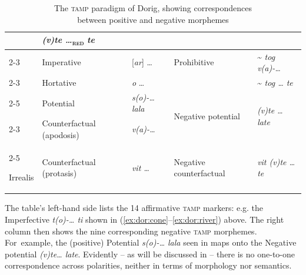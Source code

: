 \documentclass[output=paper,colorlinks,citecolor=brown,draft]{langscibook}
\begin{document}
\begin{table}
\begin{tabularx}{\textwidth}{|l|lX|ll|}
                                                                                        &  \textit{(v)te …}\textsc{\textsubscript{red}} \textit{te} \\
\cline{2-3}
             & Imperative                   & [\textit{ar}] …       & {Prohibitive}    & {\textasciitilde} \textit{tog v(a)-…}\\
\cline{2-3}
             & Hortative                    & \textit{o} …          &  & {\textasciitilde} \textit{tog … te}\\
\cline{2-5}
             & Potential                    & \textit{s(o)-… lala}  & \multirow{2}{*}{Negative potential} & \multirow{2}{*}{\textit{(v)te … late}}\\
\cline{2-3}
             & Counterfactual (apodosis) & \textit{v(a)-…} &  & \\
\cline{2-5}

{Irrealis}             & Counterfactual (protasis) & \textit{vit …} & Negative counterfactual & \textit{vit (v)te … te}\\
\hline
\end{tabularx}
    \caption{The \textsc{tamp} paradigm of Dorig, showing correspondences \\between positive and negative morphemes}
    \label{tab:dor:tamp}
\end{table}


The table’s left-hand side lists the 14 affirmative \textsc{tamp} markers: e.g. the Imper\-fec\-tive \textit{t(o)-… ti} shown in (\ref{ex:dor:cone}--\ref{ex:dor:river}) above. The right column then shows the nine corresponding negative \textsc{tamp} morphemes. For~example, the (positive) Potential \textit{s(o)-… lala} seen in  maps onto the Negative potential \textit{(v)te… late}. Evidently -- as will be discussed in  -- there is no one-to-one correspondence across polarities, neither in terms of morphology nor semantics.
\end{document}
